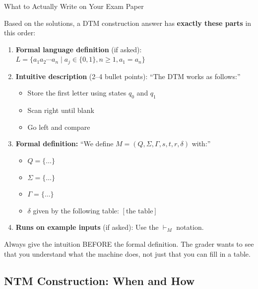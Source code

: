 \documentclass[11pt,a4paper]{article}
\newcommand{\keytakeaway}[1]{%
  \par\vspace{0.3em}%
  \colorbox{yellow!60}{\parbox{\dimexpr\linewidth-2\fboxsep}{#1}}%
  \vspace{0.3em}}
\begin{document}
\begin{conceptbox}{What to Actually Write on Your Exam Paper}

Based on the solutions, a DTM construction answer has \textbf{exactly these parts} in this order:

\begin{enumerate}
    \item \textbf{Formal language definition} (if asked): $L = \{a_1 a_2 \cdots a_n \mid a_j \in \{0,1\}, n \geq 1, a_1 = a_n\}$

    \item \textbf{Intuitive description} (2--4 bullet points): ``The DTM works as follows:''
    \begin{itemize}
        \item Store the first letter using states $q_0$ and $q_1$
        \item Scan right until blank
        \item Go left and compare
    \end{itemize}

    \item \textbf{Formal definition:} ``We define $M = (Q, \Sigma, \Gamma, s, t, r, \delta)$ with:''
    \begin{itemize}
        \item $Q = \{\ldots\}$
        \item $\Sigma = \{\ldots\}$
        \item $\Gamma = \{\ldots\}$
        \item $\delta$ given by the following table: $[\text{the table}]$
    \end{itemize}

    \item \textbf{Runs on example inputs} (if asked): Use the $\vdash_M$ notation.
\end{enumerate}

\keytakeaway{Always give the intuition BEFORE the formal definition. The grader wants to see that you understand what the machine does, not just that you can fill in a table.}
\end{conceptbox}

\subsection{NTM Construction: When and How}
\end{document}
